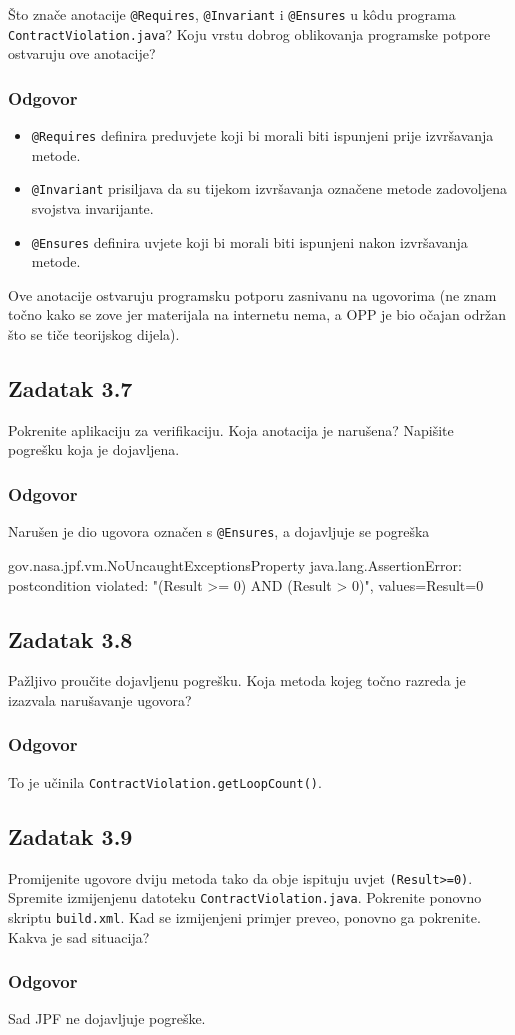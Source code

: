 \documentclass{article}
\newcommand{\zadatak}[1]{\subsection{Zadatak #1}}
\newcommand{\odgovor}{\subsubsection*{Odgovor}}
\newcommand{\code}[1]{\colorbox{blue!11}{\texttt{#1}}}
\begin{document}
Što znače anotacije \code{@Requires}, \code{@Invariant} i \code{@Ensures} u kôdu programa \texttt{ContractViolation.java}? Koju vrstu dobrog oblikovanja programske potpore ostvaruju ove anotacije?

\odgovor

\begin{itemize}
    \item \code{@Requires} definira preduvjete koji bi morali biti ispunjeni prije izvršavanja metode.
    \item \code{@Invariant} prisiljava da su tijekom izvršavanja označene metode zadovoljena svojstva invarijante.
    \item \code{@Ensures} definira uvjete koji bi morali biti ispunjeni nakon izvršavanja metode.
\end{itemize}

\noindent
Ove anotacije ostvaruju programsku potporu zasnivanu na ugovorima (ne znam točno kako se zove jer materijala na internetu nema, a OPP je bio očajan održan što se tiče teorijskog dijela).

\zadatak{3.7}

Pokrenite aplikaciju za verifikaciju. Koja anotacija je narušena? Napišite pogrešku koja je dojavljena.

\odgovor

Narušen je dio ugovora označen s \code{@Ensures}, a dojavljuje se pogreška

\begin{ccode}
gov.nasa.jpf.vm.NoUncaughtExceptionsProperty
java.lang.AssertionError: postcondition violated: "(Result >= 0) AND (Result > 0)", values={Result=0}
\end{ccode}

\zadatak{3.8}

Pažljivo proučite dojavljenu pogrešku. Koja metoda kojeg točno razreda je izazvala narušavanje ugovora?

\odgovor

To je učinila \texttt{ContractViolation.getLoopCount()}.

\zadatak{3.9}

Promijenite ugovore dviju metoda tako da obje ispituju uvjet \texttt{(Result>=0)}. Spremite izmijenjenu datoteku \texttt{ContractViolation.java}. Pokrenite ponovno skriptu \texttt{build.xml}. Kad se izmijenjeni primjer preveo, ponovno ga pokrenite. Kakva je sad situacija? 

\odgovor

Sad JPF ne dojavljuje pogreške.
\end{document}
